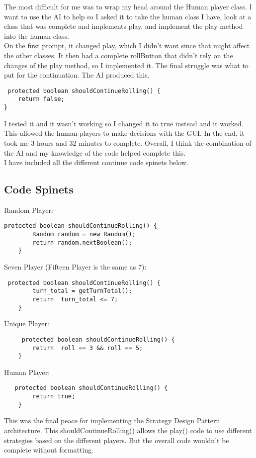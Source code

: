 \documentclass[a4paper,11pt]{article}
\begin{document}
The most difficult for me was to wrap my head around the Human player class. I want to use the AI to help so I asked it to take the human class I have, look at a class that was complete and implements play, and implement the play method into the human class.\\ 
On the first prompt, it changed play, which I didn't want since that might affect the other classes. It then had a complete rollButton that didn't rely on the changes of the play method, so I implemented it. The final struggle was what to put for the continuation. The AI produced this. 
\begin{lstlisting}
 protected boolean shouldContinueRolling() {
    return false;
}
\end{lstlisting}
I tested it and it wasn't working so I changed it to true instead and it worked. This allowed the human players to make decisions with the GUI. In the end, it took me 3 hours and 32 minutes to complete. Overall, I think the combination of the AI and my knowledge of the code helped complete this.\\
I have included all the different continue code spinets below.\\

\subsection*{Code Spinets}
Random Player:
\begin{lstlisting}
protected boolean shouldContinueRolling() {
        Random random = new Random();
        return random.nextBoolean();
    }
\end{lstlisting}
Seven Player (Fifteen Player is the same as 7):
\begin{lstlisting}
 protected boolean shouldContinueRolling() {
        turn_total = getTurnTotal();
        return  turn_total <= 7;
    }
\end{lstlisting}
Unique Player:
\begin{lstlisting}
     protected boolean shouldContinueRolling() {
        return  roll == 3 && roll == 5;
    }
\end{lstlisting}
Human Player:
\begin{lstlisting}
   protected boolean shouldContinueRolling() {
        return true; 
    }
\end{lstlisting}
This was the final peace for implementing the Strategy Design Pattern architecture. This shouldContinueRolling() allows the play() code to use different strategies based on the different players. But the overall code wouldn't be complete without formatting. 
\end{document}
